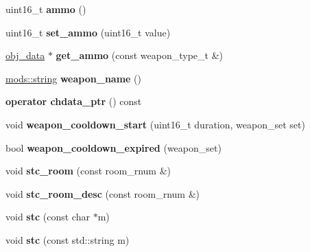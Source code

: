 \begin{DoxyCompactItemize}
uint16\+\_\+t {\bfseries ammo} ()
\item 
\mbox{\label{classmods_1_1player_a8853a1fe58152214459fbb7417a21d83}} 
uint16\+\_\+t {\bfseries set\+\_\+ammo} (uint16\+\_\+t value)
\item 
\mbox{\label{classmods_1_1player_a1a89b6c5b9e2046ad76d0a1c7d348ba9}} 
\hyperlink{structobj__data}{obj\+\_\+data} $\ast$ {\bfseries get\+\_\+ammo} (const weapon\+\_\+type\+\_\+t \&)
\item 
\mbox{\label{classmods_1_1player_a16d099bf9995465e00b21cfa8f1cd594}} 
\hyperlink{structmods_1_1string}{mods\+::string} {\bfseries weapon\+\_\+name} ()
\item 
\mbox{\label{classmods_1_1player_ae42a701bdd5d5fb46d7658cad6161464}} 
{\bfseries operator chdata\+\_\+ptr} () const
\item 
\mbox{\label{classmods_1_1player_a74ab8e7f2cf826fe6f4a6bc0fa8a0efa}} 
void {\bfseries weapon\+\_\+cooldown\+\_\+start} (uint16\+\_\+t duration, weapon\+\_\+set set)
\item 
\mbox{\label{classmods_1_1player_a2489270f0eeb5e26ec509dcb75cd8bb4}} 
bool {\bfseries weapon\+\_\+cooldown\+\_\+expired} (weapon\+\_\+set)
\item 
\mbox{\label{classmods_1_1player_a05030c2c9439f95c84704ed6f7c993d1}} 
void {\bfseries stc\+\_\+room} (const room\+\_\+rnum \&)
\item 
\mbox{\label{classmods_1_1player_a6195057ece7899142c460e5322498a4a}} 
void {\bfseries stc\+\_\+room\+\_\+desc} (const room\+\_\+rnum \&)
\item 
\mbox{\label{classmods_1_1player_a550769bddbe79e5086130df7deef07f7}} 
void {\bfseries stc} (const char $\ast$m)
\item 
\mbox{\label{classmods_1_1player_a0aaa555bf45fb81f83a08e083f28fac1}} 
void {\bfseries stc} (const std\+::string m)
\item 
\mbox{\label{classmods_1_1player_ac4743c458be0d770a0f45fb7c029aff4}} 

\end{DoxyCompactItemize}
